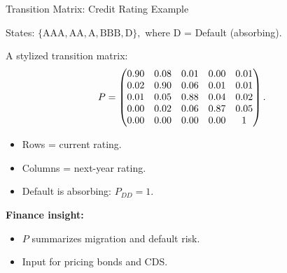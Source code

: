 \documentclass[aspectratio=169]{beamer}
\begin{document}
\begin{frame}{Transition Matrix: Credit Rating Example}

States:
$
\{\text{AAA},\text{AA},\text{A},\text{BBB},\text{D}\},
$
where $\text{D}$ = Default (absorbing).\pause

A stylized transition matrix:
\[
P=
\begin{pmatrix}
0.90 & 0.08 & 0.01 & 0.00 & 0.01\\
0.02 & 0.90 & 0.06 & 0.01 & 0.01\\
0.01 & 0.05 & 0.88 & 0.04 & 0.02\\
0.00 & 0.02 & 0.06 & 0.87 & 0.05\\
0.00 & 0.00 & 0.00 & 0.00 & 1
\end{pmatrix}.
\vspace{-5mm}
\]\pause

\begin{itemize}
  \item Rows = current rating.\pause
  \item Columns = next-year rating.\pause
  \item Default is absorbing: $P_{DD}=1$.\pause
  \vspace{-3mm}
\end{itemize}

\medskip
\textbf{Finance insight:}
\begin{itemize}
  \item $P$ summarizes migration and default risk.\pause
  \item Input for pricing bonds and CDS.
\end{itemize}
\end{frame}
\end{document}
